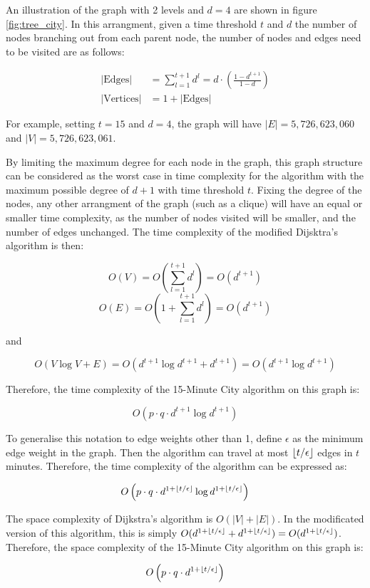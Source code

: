 An illustration of the graph with 2 levels and $d = 4$ are shown in figure \ref{fig:tree_city}. In this arrangment, given a time threshold $t$ and $d$ the number of nodes branching out from each parent node, the number of nodes and edges need to be visited are as follows:

$$
\begin{aligned}
    |\text{Edges}|&=\sum_{l=1}^{t+1} d^l=d\cdot\left(\frac{1-d^{t+1}}{1-d}\right)\\
    |\text{Vertices}|&=1+|\text{Edges}|
\end{aligned}
$$

For example, setting $t=15$ and $d=4$, the graph will have $|E|=5,726,623,060$ and $|V|=5,726,623,061$.

By limiting the maximum degree for each node in the graph, this graph structure can be considered as the worst case in time complexity for the algorithm with the maximum possible degree of $d+1$ with time threshold $t$. Fixing the degree of the nodes, any other arrangment of the graph (such as a clique) will have an equal or smaller time complexity, as the number of nodes visited will be smaller, and the number of edges unchanged. The time complexity of the modified Dijsktra's algorithm is then:

$$O(V)=O(\sum_{l=1}^{t+1} d^l)=O(d^{t+1})$$
$$O(E)=O(1+\sum_{l=1}^{t+1} d^l)=O(d^{t+1})$$

and

$$O(V\log V+E)=O(d^{t+1}\log d^{t+1}+d^{t+1})=O(d^{t+1}\log d^{t+1})$$

Therefore, the time complexity of the 15-Minute City algorithm on this graph is:

$$O\left(p\cdot q\cdot d^{t+1}\log d^{t+1}\right)$$

To generalise this notation to edge weights other than 1, define $\epsilon$ as the minimum edge weight in the graph. Then the algorithm can travel at most $\floor*{t/\epsilon}$ edges in $t$ minutes. Therefore, the time complexity of the algorithm can be expressed as:

$$O\left(p\cdot q\cdot d^{1+\floor*{t/\epsilon}}\log d^{1+\floor*{t/\epsilon}}\right)$$

The space complexity of Dijkstra's algorithm is $O(|V|+|E|)$. In the modificated version of this algorithm, this is simply $O(d^{1+\floor*{t/\epsilon}}+d^{1+\floor*{t/\epsilon}}) = O(d^{1+\floor*{t/\epsilon}})$. Therefore, the space complexity of the 15-Minute City algorithm on this graph is:

$$O\left(p\cdot q\cdot d^{1+\floor*{t/\epsilon}}\right)$$

